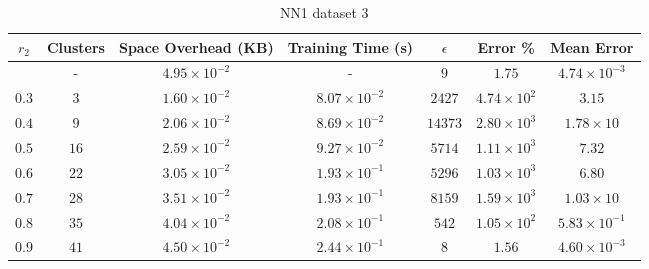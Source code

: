 \begin{adjustwidth}{-1cm}{}
\begin{table}
\caption{NN1 dataset 3}\label{ws13}
\begin{tabular}{ccccccc}
\hline
\toprule
$r_2$ & Clusters & Space Overhead (KB) & Training Time (s) & $\epsilon$ & Error \% & Mean Error\\
\midrule
 & - & $4.95 \times 10^{-2}$ & - & $9$ & $1.75$ & $4.74 \times 10^{-3}$\\
$0.3$ & $3$ & $1.60 \times 10^{-2}$ & $8.07 \times 10^{-2}$ & $2427$ & $4.74 \times 10^2$ & $3.15$\\
$0.4$ & $9$ & $2.06 \times 10^{-2}$ & $8.69 \times 10^{-2}$ & $14373$ & $2.80 \times 10^3$ & $1.78 \times 10$\\
$0.5$ & $16$ & $2.59 \times 10^{-2}$ & $9.27 \times 10^{-2}$ & $5714$ & $1.11 \times 10^3$ & $7.32$\\
$0.6$ & $22$ & $3.05 \times 10^{-2}$ & $1.93 \times 10^{-1}$ & $5296$ & $1.03 \times 10^3$ & $6.80$\\
$0.7$ & $28$ & $3.51 \times 10^{-2}$ & $1.93 \times 10^{-1}$ & $8159$ & $1.59 \times 10^3$ & $1.03 \times 10$\\
$0.8$ & $35$ & $4.04 \times 10^{-2}$ & $2.08 \times 10^{-1}$ & $542$ & $1.05 \times 10^2$ & $5.83 \times 10^{-1}$\\
$0.9$ & $41$ & $4.50 \times 10^{-2}$ & $2.44 \times 10^{-1}$ & $8$ & $1.56$ & $4.60 \times 10^{-3}$\\
\bottomrule
\end{tabular}
\end{table}
\end{adjustwidth}

